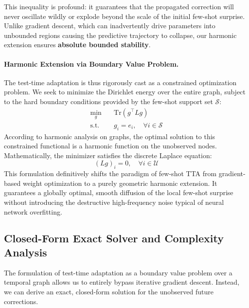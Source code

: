 \documentclass{article}
\begin{document}
This inequality is profound: it guarantees that the propagated correction will never oscillate wildly or explode beyond the scale of the initial few-shot surprise. Unlike gradient descent, which can inadvertently drive parameters into unbounded regions causing the predictive trajectory to collapse, our harmonic extension ensures \textbf{absolute bounded stability}.

\paragraph{Harmonic Extension via Boundary Value Problem.} The test-time adaptation is thus rigorously cast as a constrained optimization problem. We seek to minimize the Dirichlet energy over the entire graph, subject to the hard boundary conditions provided by the few-shot support set $\mathcal{S}$:
\begin{align}
    \min_{g} \quad & \text{Tr}(g^\top L g) \\
    \text{s.t.} \quad & g_i = e_i, \quad \forall i \in \mathcal{S} \nonumber
\end{align}
According to harmonic analysis on graphs, the optimal solution to this constrained functional is a harmonic function on the unobserved nodes. Mathematically, the minimizer satisfies the discrete Laplace equation:
\begin{equation}
    (L g)_i = 0, \quad \forall i \in \mathcal{U}
\end{equation}
This formulation definitively shifts the paradigm of few-shot TTA from gradient-based weight optimization to a purely geometric harmonic extension. It guarantees a globally optimal, smooth diffusion of the local few-shot surprise without introducing the destructive high-frequency noise typical of neural network overfitting.	

\subsection{Closed-Form Exact Solver and Complexity Analysis}

The formulation of test-time adaptation as a boundary value problem over a temporal graph allows us to entirely bypass iterative gradient descent. Instead, we can derive an exact, closed-form solution for the unobserved future corrections.
\end{document}
